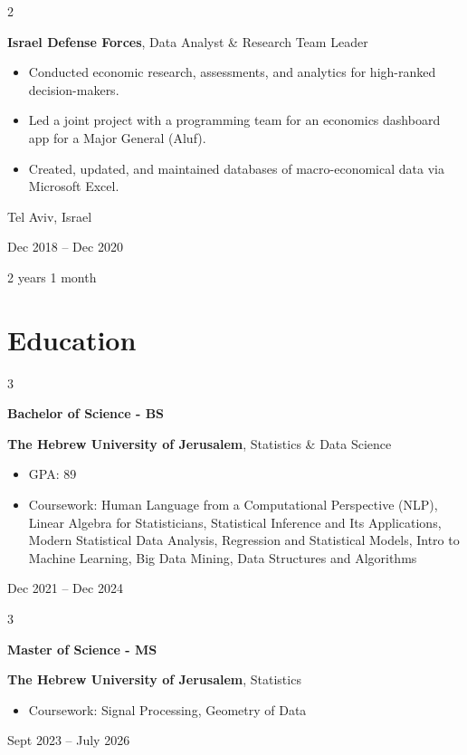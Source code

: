 \documentclass[10pt, letterpaper]{article}
\newenvironment{highlights}{
    \begin{itemize}[
        topsep=0.10 cm,
        parsep=0.10 cm,
        partopsep=0pt,
        itemsep=0pt,
        leftmargin=0.4 cm + 10pt
    ]
}{
    \end{itemize}
} %
\newenvironment{twocolentry}[2][]{
    \onecolentry
    \def\secondColumn{#2}
    \setcolumnwidth{\fill, 4.5 cm}
    \begin{paracol}{2}
}{
    \switchcolumn \raggedleft \secondColumn
    \end{paracol}
    \endonecolentry
} %
\newenvironment{threecolentry}[3][]{
    \onecolentry
    \def\thirdColumn{#3}
    \setcolumnwidth{1 cm, \fill, 4.5 cm}
    \begin{paracol}{3}
    {\raggedright #2} \switchcolumn
}{
    \switchcolumn \raggedleft \thirdColumn
    \end{paracol}
    \endonecolentry
} %
\begin{document}
        \begin{twocolentry}{
            Tel Aviv, Israel

        Dec 2018 – Dec 2020

        2 years 1 month
        }
            \textbf{Israel Defense Forces}, Data Analyst \& Research Team Leader
            \begin{highlights}
                \item Conducted economic research, assessments, and analytics for high-ranked decision-makers.
                \item Led a joint project with a programming team for an economics dashboard app for a Major General (Aluf).
                \item Created, updated, and maintained databases of macro-economical data via Microsoft Excel.
            \end{highlights}
        \end{twocolentry}



    
    \section{Education}



        
        \begin{threecolentry}{\textbf{Bachelor of Science - BS}}{
            Dec 2021 – Dec 2024
        }
            \textbf{The Hebrew University of Jerusalem}, Statistics \& Data Science
            \begin{highlights}
                \item GPA: 89
                \item Coursework: Human Language from a Computational Perspective (NLP), Linear Algebra for Statisticians, Statistical Inference and Its Applications, Modern Statistical Data Analysis, Regression and Statistical Models, Intro to Machine Learning, Big Data Mining, Data Structures and Algorithms
            \end{highlights}
        \end{threecolentry}

        \vspace{0.2 cm}

        \begin{threecolentry}{\textbf{Master of Science - MS}}{
            Sept 2023 – July 2026
        }
            \textbf{The Hebrew University of Jerusalem}, Statistics
            \begin{highlights}
                \item Coursework: Signal Processing, Geometry of Data
            \end{highlights}
        \end{threecolentry}
\end{document}
